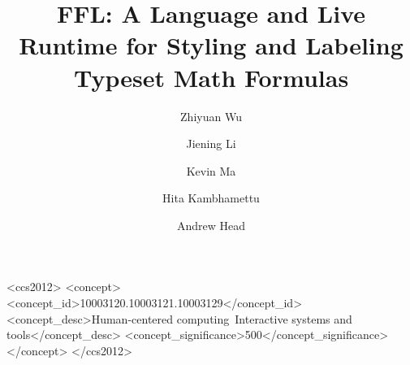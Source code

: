 \documentclass[sigconf]{acmart}
\begin{document}
\title[FFL: Live Styling and Labeling of Typeset Math Formulas]{FFL: A Language and Live Runtime for Styling and Labeling Typeset Math Formulas}



\begin{abstract}

\end{abstract}



\author{Zhiyuan Wu}
\author{Jiening Li}
\author{Kevin Ma}
\author{Hita Kambhamettu}
\author{Andrew Head}

\renewcommand{\shortauthors}{Wu et al.}

\begin{CCSXML}
<ccs2012>
   <concept>
       <concept_id>10003120.10003121.10003129</concept_id>
       <concept_desc>Human-centered computing~Interactive systems and tools</concept_desc>
       <concept_significance>500</concept_significance>
       </concept>
 </ccs2012>
\end{CCSXML}
\end{document}

